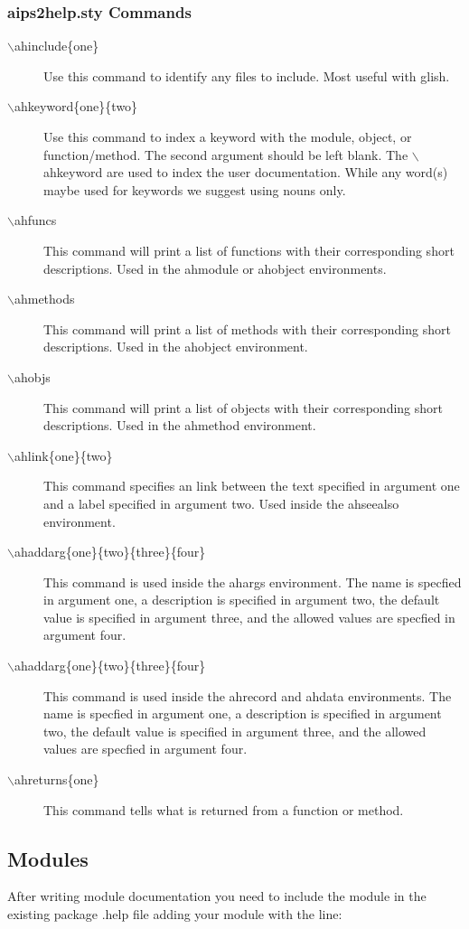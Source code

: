 \subsubsection{aips2help.sty Commands}

\begin{description}
\item[$\backslash$ahinclude\{one\}] Use this command to identify any files to include.
Most useful with glish.
%
\item[$\backslash$ahkeyword\{one\}\{two\}] Use this command to index a keyword with
the module, object, or function/method.  The second argument should
be left blank.
The $\backslash$ahkeyword are used to index the user documentation.  
 While any word(s) maybe used for keywords we suggest using nouns only.
%
\item[$\backslash$ahfuncs{}] This command will print a list of functions with their
corresponding short descriptions.  Used in the ahmodule or ahobject
environments.  
%
\item[$\backslash$ahmethods{}]  This command will print a list of methods with their
corresponding short descriptions.  Used in the ahobject environment.
%
\item[$\backslash$ahobjs{}]  This command will print a list of objects with their
corresponding short descriptions.  Used in the ahmethod environment.
%
\item[$\backslash$ahlink\{one\}\{two\}] This command specifies an link between the
text specified in argument one and a label specified in argument two.  Used
inside the ahseealso environment.
%
\item[$\backslash$ahaddarg\{one\}\{two\}\{three\}\{four\}] This command is used inside
the ahargs environment.  The name is specfied in argument one, a description
is specified in argument two, the default value is specified in argument
three, and the allowed values are specfied in argument four.  
\item[$\backslash$ahaddarg\{one\}\{two\}\{three\}\{four\}] This command is
used inside the ahrecord and ahdata environments. The name is specfied in argument one, a description
is specified in argument two, the default value is specified in argument
three, and the allowed values are specfied in argument four.  
%
\item[$\backslash$ahreturns\{one\}] This command tells what is returned from a function
or method.
\end{description}


\subsection{Modules}
After writing module
documentation you need to include the module in the existing package .help
file adding your module with the line:\\
\begin{verbatim}

\end{verbatim}

